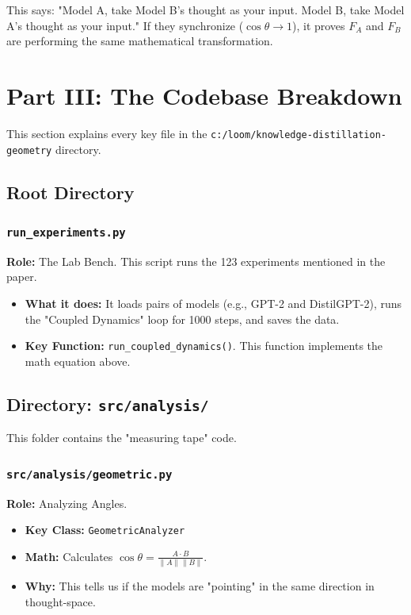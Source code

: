 \documentclass[11pt,a4paper]{article}
\begin{document}
This says: "Model A, take Model B's thought as your input. Model B, take Model A's thought as your input."
If they synchronize ($\cos \theta \to 1$), it proves $F_A$ and $F_B$ are performing the same mathematical transformation.

\newpage
\section{Part III: The Codebase Breakdown}

This section explains every key file in the \texttt{c:/loom/knowledge-distillation-geometry} directory.

\subsection{Root Directory}

\subsubsection{\texttt{run\_experiments.py}}
\textbf{Role:} The Lab Bench.
This script runs the 123 experiments mentioned in the paper.
\begin{itemize}
    \item \textbf{What it does:} It loads pairs of models (e.g., GPT-2 and DistilGPT-2), runs the "Coupled Dynamics" loop for 1000 steps, and saves the data.
    \item \textbf{Key Function:} \texttt{run\_coupled\_dynamics()}. This function implements the math equation above.
\end{itemize}

\subsection{Directory: \texttt{src/analysis/}}
This folder contains the "measuring tape" code.

\subsubsection{\texttt{src/analysis/geometric.py}}
\textbf{Role:} Analyzing Angles.
\begin{itemize}
    \item \textbf{Key Class:} \texttt{GeometricAnalyzer}
    \item \textbf{Math:} Calculates $\cos \theta = \frac{A \cdot B}{\|A\| \|B\|}$.
    \item \textbf{Why:} This tells us if the models are "pointing" in the same direction in thought-space.
\end{itemize}
\end{document}
